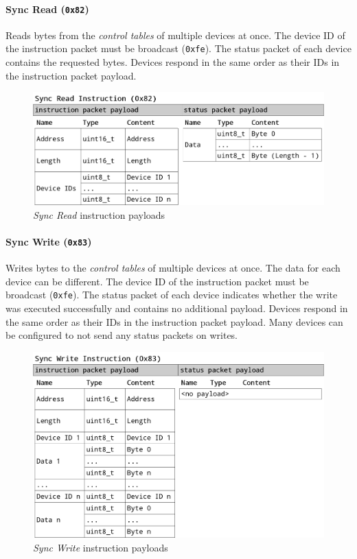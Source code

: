 \paragraph{Sync Read (\lstinline{0x82})}

Reads bytes from the \textit{control tables} of multiple devices at once. The device ID of the
instruction packet must be broadcast (\lstinline{0xfe}). The status packet of each device contains
the requested bytes. Devices respond in the same order as their IDs in the instruction packet
payload.

\begin{figure}[H]
    \centering
    \includegraphics[scale=0.2]{img/sync_read_packet.png}
    \caption{\textit{Sync Read} instruction payloads}
\end{figure}

\clearpage
\paragraph{Sync Write (\lstinline{0x83})}

Writes bytes to the \textit{control tables} of multiple devices at once. The data for each device
can be different. The device ID of the instruction packet must be broadcast (\lstinline{0xfe}). The
status packet of each device indicates whether the write was executed successfully and contains no
additional payload. Devices respond in the same order as their IDs in the instruction packet
payload. Many devices can be configured to not send any status packets on writes.

\begin{figure}[H]
    \centering
    \includegraphics[scale=0.2]{img/sync_write_packet.png}
    \caption{\textit{Sync Write} instruction payloads}
\end{figure}

